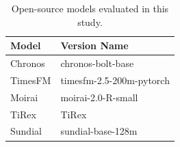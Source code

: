 
\begin{table}[hbt!]
\centering

\begin{tabular}{ll}
\toprule
\textbf{Model} & \textbf{Version Name} \\
\midrule
Chronos\footnotemark[1] & chronos-bolt-base \\
TimesFM\footnotemark[2] & timesfm-2.5-200m-pytorch \\
Moirai\footnotemark[3] & moirai-2.0-R-small \\
TiRex\footnotemark[4] & TiRex \\
Sundial\footnotemark[5] & sundial-base-128m \\
\bottomrule
\end{tabular}
\caption{Open-source models evaluated in this study.}
\label{tab:models}
\end{table}